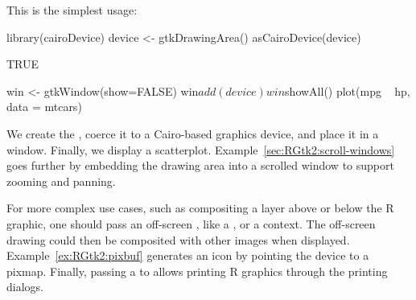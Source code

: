 This is the simplest usage:
\begin{Schunk}
\begin{Sinput}
 library(cairoDevice)
 device <- gtkDrawingArea()
 asCairoDevice(device)
\end{Sinput}
\begin{Soutput}
[1] TRUE
\end{Soutput}
\begin{Sinput}
 win <- gtkWindow(show=FALSE)
 win$add(device)
 win$showAll()
 plot(mpg ~ hp, data = mtcars)
\end{Sinput}
\end{Schunk}
%
We create the , coerce it to a Cairo-based
graphics device, and place it in a window. Finally, we display a
scatterplot. Example~\ref{sec:RGtk2:scroll-windows} goes further by
embedding the drawing area into a scrolled window to support zooming
and panning.

For more complex use cases, such as compositing a layer above or below
the R graphic, one should pass an off-screen , like
a , or a  context. The off-screen
drawing could then be composited with other images when
displayed. Example~\ref{ex:RGtk2:pixbuf} generates an icon by pointing
the device to a pixmap. Finally, passing a  to
 allows printing R graphics through the \GTK\/
printing dialogs.

